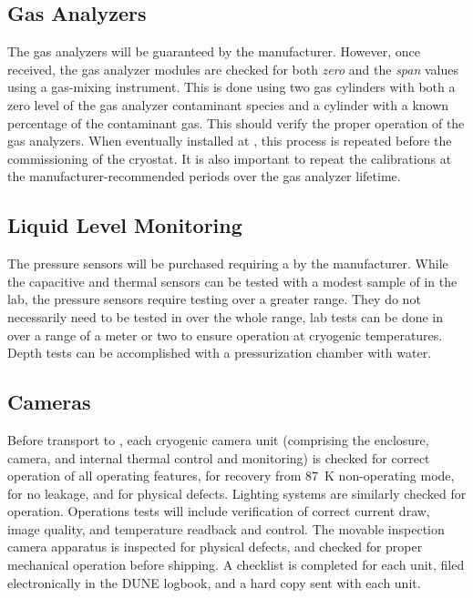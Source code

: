 \subsection{Gas Analyzers}
\label{sec:fdgen-slow-cryo-qc-ga}

The gas analyzers will be guaranteed by the manufacturer. However, once received, the gas analyzer modules are checked for both \textit{zero} and the \textit{span} values using a gas-mixing instrument. This is done using two gas cylinders with both a zero level of the gas analyzer contaminant species and a cylinder with a known percentage of the contaminant gas. This should verify the proper operation of the gas analyzers. When eventually installed at \surf, this process is repeated before the commissioning of the cryostat. It is also important to repeat the calibrations at the manufacturer-recommended periods over the gas analyzer lifetime.


\subsection{Liquid Level Monitoring}
\label{sec:fdgen-slow-cryo-qc-llm}

The pressure sensors will be purchased requiring a  by the manufacturer.
While the capacitive and thermal sensors can be tested with a modest sample of \lar in the lab,
the pressure sensors require testing over a greater range.  They do not
necessarily need to be tested in \lar over the whole range,  lab tests
can be done in \lar over a range of a meter or two to ensure operation
at cryogenic temperatures.  Depth tests can be accomplished with a
pressurization chamber with water.

\subsection{Cameras}
\label{sec:fdgen-slow-cryo-qc-c}

Before transport to \surf, each cryogenic camera unit (comprising the enclosure, camera, and internal thermal control and monitoring) is checked for correct operation of all operating features, for recovery from \SI{87}{K} non-operating mode, for no leakage, and for physical defects. Lighting systems are similarly checked for operation. Operations tests will include verification of correct current draw, image quality, and temperature readback and control. The movable inspection camera apparatus is inspected for physical defects, and checked for proper mechanical operation before shipping. A checklist is completed for each unit, filed electronically in the DUNE logbook, and a hard copy sent with each unit. 

